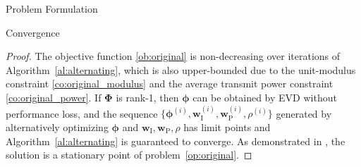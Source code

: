 \documentclass[journal]{IEEEtran}
\begin{document}
\begin{section}{Problem Formulation}
\begin{subsection}{Convergence}
			\begin{proof}\label{pf:ao}
				The objective function \eqref{ob:original} is non-decreasing over iterations of Algorithm~\ref{al:alternating}, which is also upper-bounded due to the unit-modulus constraint \eqref{co:original_modulus} and the average transmit power constraint \eqref{co:original_power}. If $\boldsymbol{\Phi}$ is rank-\num{1}, then $\boldsymbol{\phi}$ can be obtained by EVD without performance loss, and the sequence $\{\boldsymbol{\phi}^{(i)},\boldsymbol{w}_{\mathrm{I}}^{(i)},\boldsymbol{w}_{\mathrm{P}}^{(i)},\rho^{(i)}\}$ generated by alternatively optimizing $\boldsymbol{\phi}$ and $\boldsymbol{w}_{\mathrm{I}},\boldsymbol{w}_{\mathrm{P}},\rho$ has limit points and Algorithm~\ref{al:alternating} is guaranteed to converge. As demonstrated in \cite{Grippo2000}, the solution is a stationary point of problem~\eqref{op:original}.
			\end{proof}
		\end{subsection}
	\end{section}
\end{document}
